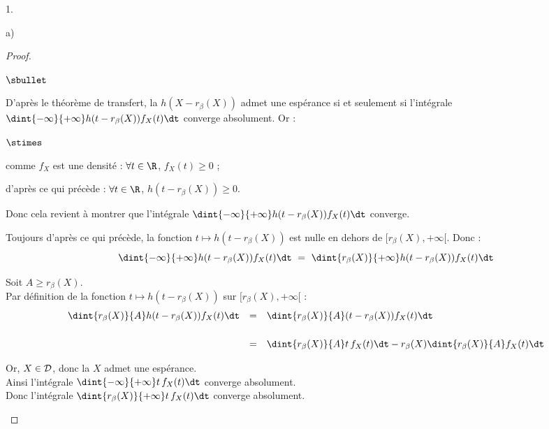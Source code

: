 \documentclass[11pt]{article}%
\begin{document}
\begin{noliste}{1.}
\begin{noliste}{a)}
\begin{proof}
\begin{noliste}{$\sbullet$}
    \item D'après le théorème de transfert, la \var $h(X- r_\beta(X))$
      admet une espérance si et seulement si l'intégrale
      $\dint{-\infty}{+\infty} h(t- r_\beta(X)) f_X(t) \dt$ converge
      absolument. Or :
	\begin{noliste}{$\stimes$}
	  \item comme $f_X$ est une densité : $\forall t\in \R$, 
	  $f_X(t) \geq 0$ ;
	  \item d'après ce qui précède : $\forall t \in \R$, 
	  $h(t- r_\beta(X)) \geq 0$.
	\end{noliste}
	Donc cela revient à montrer que l'intégrale $\dint{-\infty}
	{+\infty} h(t-r_\beta(X)) f_X(t) \dt$ converge.
	
	\item Toujours d'après ce qui précède, la fonction $t \mapsto 
	h(t-r_\beta(X))$ est nulle en dehors de $[r_\beta(X), 
	+\infty[$. Donc :
	\[
	  \dint{-\infty}{+\infty} h(t-r_\beta(X)) f_X(t) \dt \ = \
	  \dint{r_\beta(X)}{+\infty} h(t-r_\beta(X)) f_X(t) \dt
	\]
	
	
	
	\newpage
	
	
	\item Soit $A \geq r_\beta(X)$.\\
	Par définition de la fonction $t\mapsto h(t- r_\beta(X))$ 
	sur $[r_\beta(X), +\infty[$ :
	\[
	  \begin{array}{rcl}
	    \dint{r_\beta(X)}{A} h(t-r_\beta(X)) f_X(t) \dt &=& 
	    \dint{r_\beta(X)}{A} (t-r_\beta(X)) f_X(t) \dt
	    \\[.6cm]
	    &=& \dint{r_\beta(X)}{A} t \, f_X(t) \dt - 
	    r_\beta(X) \dint{r_\beta(X)}{A} f_X(t) \dt
	  \end{array}
	\]
	
	\item Or, $X\in {\cal D}$, donc la \var $X$ admet une 
	espérance.\\[.1cm]
	Ainsi l'intégrale $\dint{-\infty}{+\infty} t \, f_X(t) \dt$
	converge absolument.\\[.1cm]
	Donc l'intégrale $\dint{r_\beta(X)}{+\infty} t\, f_X(t) \dt$
	converge absolument.
	

\end{noliste}
\end{proof}
\end{noliste}
\end{noliste}
\end{document}
